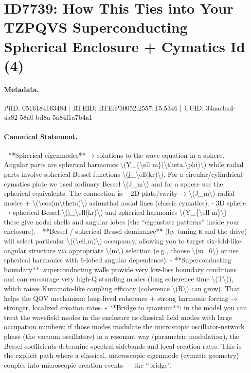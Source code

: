 \section*{ID7739: How This Ties into Your TZPQVS Superconducting Spherical Enclosure + Cymatics Id (4)}
\paragraph{Metadata.}
PiID: 0516184163484 | RTEID: RTE:P30052.2557:T5.5346 | UUID: 34aacba4-4a82-58a0-bd8a-5a84f1a7b4a1

\paragraph{Canonical Statement.}
- **Spherical eigenmodes** → solutions to the wave equation in a sphere. Angular parts are spherical harmonics \textbackslash{}(Y\_\{\textbackslash{}ell m\}(\textbackslash{}theta,\textbackslash{}phi)\textbackslash{}) while radial parts involve spherical Bessel functions \textbackslash{}(j\_\textbackslash{}ell(kr)\textbackslash{}). For a circular/cylindrical cymatics plate we used ordinary Bessel \textbackslash{}(J\_m\textbackslash{}) and for a sphere use the spherical equivalents. The connection is: - 2D plate/cavity → \textbackslash{}(J\_m\textbackslash{}) radial modes + \textbackslash{}(\textbackslash{}cos(m\textbackslash{}theta)\textbackslash{}) azimuthal nodal lines (classic cymatics). - 3D sphere → spherical Bessel \textbackslash{}(j\_\textbackslash{}ell(kr)\textbackslash{}) and spherical harmonics \textbackslash{}(Y\_\{\textbackslash{}ell m\}\textbackslash{}) — these give nodal shells and angular lobes (the “eigenstate patterns” inside your enclosure). - **Bessel / spherical-Bessel dominance** (by tuning κ and the drive) will select particular \textbackslash{}((\textbackslash{}ell,m)\textbackslash{}) occupancy, allowing you to target six-fold-like angular structure via appropriate \textbackslash{}(m\textbackslash{}) selection (e.g., choose \textbackslash{}(m=6\textbackslash{}) or use spherical harmonics with 6-lobed angular dependence). - **Superconducting boundary**: superconducting walls provide very low-loss boundary conditions and can encourage very high-Q standing modes (long coherence time \textbackslash{}(T\textbackslash{})), which raises Kuramoto-like coupling efficacy (coherence \textbackslash{}(R\textbackslash{}) can grow). That helps the QOV mechanism: long-lived coherence + strong harmonic forcing → stronger, localized creation rates. - **Bridge to quantum**: in the model you can treat the wavefield modes in the enclosure as classical field modes with large occupation numbers; if those modes modulate the microscopic oscillator-network phase (the vacuum oscillators) in a resonant way (parametric modulation), the Bessel coefficients determine spectral sidebands and local creation rates. This is the explicit path where a classical, macroscopic eigenmode (cymatic geometry) couples into microscopic creation events — the “bridge”.

